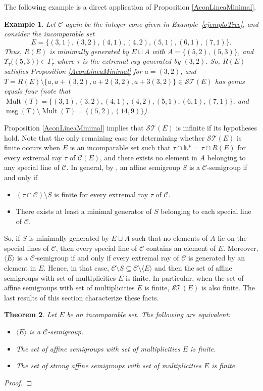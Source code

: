 \documentclass[a4paper,11pt]{article}
\newtheorem{theorem}{Theorem}
\newtheorem{example}[theorem]{Example}
\def\CaC{\mathcal{C}}
\def\N{\mathbb{N}}
\def\msg{\operatorname{msg}}
\def\Mult{\operatorname{Mult}}
\begin{document}
{The following example is a direct application of Proposition \ref{AconLineaMinimal}.

\begin{example}
Let $\CaC$ again be the integer cone given in Example~\ref{ejemploTree}, and consider the incomparable set
$$E=\{(3,1), (3,2), (4,1), (4,2), (5,1), (6,1), (7,1)\}.$$
Thus, $R(E)$ is minimally generated by $E\sqcup A$ with $A=\{(5,2), (5,3)\}$, and $\Upsilon_\tau\big((5,3)\big)\in \Gamma_\tau$ where $\tau$ is the extremal ray generated by $(3,2)$. So, $R(E)$ satisfies Proposition \ref{AconLineaMinimal} for $a=(3,2)$, and $T=R(E)\setminus\{a,a+(3,2),a+2(3,2),a+3(3,2)\}\in\mathcal{ST}(E)$ has genus equals four (note that $\Mult(T)=\{(3,1), (3,2), (4,1), (4,2), (5,1), (6,1), (7,1)\}$, and $\msg(T)\setminus\Mult(T)=\{(5,2), (14,9)\}$).
\end{example}

Proposition \ref{AconLineaMinimal} implies that $\mathcal{ST}(E)$ is infinite if its hypotheses hold.
Note that the only remaining case for determining whether $\mathcal{ST}(E)$ is finite occurs when $E$ is an incomparable set such that $\tau \cap \N^p = \tau \cap R(E)$ for every extremal ray $\tau$ of $\CaC(E)$, and there exists no element in $A$ belonging to any special line of $\CaC$.
In general, by \cite[Theorem 9]{check_C_semigr}, an affine semigroup $S$ is a $\CaC$-semigroup if and only if
\begin{itemize}
\item  $(\tau\cap \CaC)\setminus  S$ is finite for every extremal ray $\tau$ of $\CaC$.
\item There exists at least a minimal generator of $S$ belonging to each special line of $\CaC$.
\end{itemize}
So, if $S$ is minimally generated by $E\sqcup A$ such that no elements of $A$ lie on the special lines of $\CaC$, then every special line of $\CaC$ contains an element of $E$.
Moreover, $\langle E\rangle$ is a $\CaC$-semigroup if and only if every extremal ray of $\CaC$ is generated by an element in $E$. Hence, in that case, $\CaC\setminus S\subseteq\CaC\setminus \langle E\rangle$ and then the set of affine semigroups with set of multiplicities $E$ is finite.
In particular, when the set of affine semigroups with set of multiplicities $E$ is finite, $\mathcal{ST}(E)$ is also finite.
The last results of this section characterize these facts.


\begin{theorem}Let $E$ be an incomparable set. The following are equivalent:
\begin{itemize}
\item[{\rm (a)}] $\langle E \rangle$ is a $\CaC$-semigroup.
\item[{\rm (b)}] The set of affine semigroups with set of multiplicities $E$ is finite.
\item[{\rm (c)}] The set of strong affine semigroups with set of multiplicities $E$ is finite.
\end{itemize}
\end{theorem}
\begin{proof}


\end{proof}}
\end{document}
